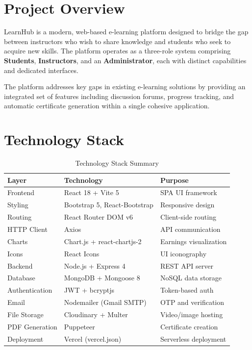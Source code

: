 \documentclass[12pt,a4paper]{report}
\begin{document}
\section{Project Overview}
LearnHub is a modern, web-based e-learning platform designed to bridge the gap between instructors who wish to share knowledge and students who seek to acquire new skills. The platform operates as a three-role system comprising \textbf{Students}, \textbf{Instructors}, and an \textbf{Administrator}, each with distinct capabilities and dedicated interfaces.

The platform addresses key gaps in existing e-learning solutions by providing an integrated set of features including discussion forums, progress tracking, and automatic certificate generation within a single cohesive application.

\section{Technology Stack}
\begin{table}[H]
\centering
\caption{Technology Stack Summary}
\label{tab:techstack}
\begin{tabular}{@{}lll@{}}
\toprule
\textbf{Layer} & \textbf{Technology} & \textbf{Purpose} \\ \midrule
Frontend       & React 18 + Vite 5        & SPA UI framework \\
Styling        & Bootstrap 5, React-Bootstrap & Responsive design \\
Routing        & React Router DOM v6       & Client-side routing \\
HTTP Client    & Axios                     & API communication \\
Charts         & Chart.js + react-chartjs-2 & Earnings visualization \\
Icons          & React Icons               & UI iconography \\
Backend        & Node.js + Express 4       & REST API server \\
Database       & MongoDB + Mongoose 8      & NoSQL data storage \\
Authentication & JWT + bcryptjs            & Token-based auth \\
Email          & Nodemailer (Gmail SMTP)   & OTP and verification \\
File Storage   & Cloudinary + Multer       & Video/image hosting \\
PDF Generation & Puppeteer                 & Certificate creation \\
Deployment     & Vercel (vercel.json)      & Serverless deployment \\ \bottomrule
\end{tabular}
\end{table}
\end{document}
